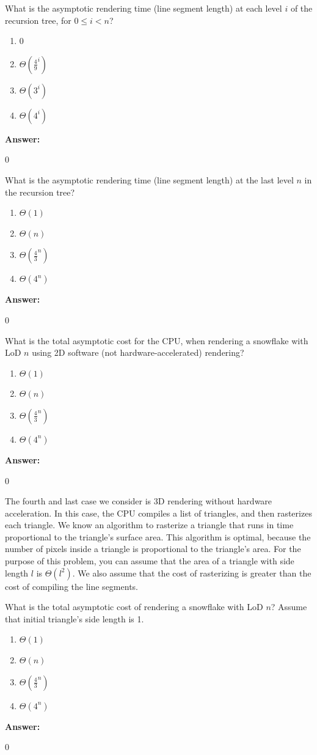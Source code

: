 \documentclass[12pt,twoside]{article}
\newcommand{\answer}{
 \par\medskip
 \textbf{Answer:}
}
\newcommand{\answerIq}{ \answer
0
}
\newcommand{\answerIr}{ \answer
0
}
\newcommand{\answerIs}{ \answer
0
}
\newcommand{\answerIt}{ \answer
0
}
\begin{document}
\begin{problems}
\begin{problemparts}
  \problempart {} What is the asymptotic rendering time (line segment length)
  at each level $i$ of the recursion tree, for $0 \le i < n$?
    \begin{enumerate}
      \item 0
      \item $\Theta(\frac{4}{9} ^ i)$
      \item $\Theta(3 ^ i)$
      \item $\Theta(4 ^ i)$
    \end{enumerate}
\answerIq

  \problempart {} What is the asymptotic rendering time (line segment length)
  at the last level $n$ in the recursion tree?
    \begin{enumerate}
      \item $\Theta(1)$
      \item $\Theta(n)$
      \item $\Theta(\frac{4}{3}^n)$
      \item $\Theta(4^n)$
    \end{enumerate}
\answerIr

  \problempart {} What is the total asymptotic cost for the CPU, when rendering
  a snowflake with LoD $n$ using 2D software (not hardware-accelerated)
  rendering?
   \begin{enumerate}
      \item $\Theta(1)$
      \item $\Theta(n)$
      \item $\Theta(\frac{4}{3}^n)$
      \item $\Theta(4^n)$
    \end{enumerate}
\answerIs

\end{problemparts}

The fourth and last case we consider is 3D rendering without hardware
acceleration. In this case, the CPU compiles a list of triangles, and then
rasterizes each triangle. We know an algorithm to rasterize a triangle that
runs in time proportional to the triangle's surface area. This algorithm is
optimal, because the number of pixels inside a triangle is proportional to the
triangle's area. For the purpose of this problem, you can assume that the area
of a triangle with side length $l$ is $\Theta(l^2)$. We also assume that the
cost of rasterizing is greater than the cost of compiling the line segments.

\begin{problemparts}
  \problempart {} What is the total asymptotic cost of rendering a snowflake
  with LoD $n$? Assume that initial triangle's side length is 1.
    \begin{enumerate}
      \item $\Theta(1)$
      \item $\Theta(n)$
      \item $\Theta(\frac{4}{3}^n)$
      \item $\Theta(4^n)$
    \end{enumerate}
\answerIt
    

\end{problemparts}
\end{problems}
\end{document}
